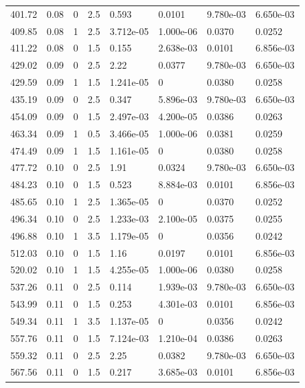 \documentclass[preview]{standalone}
\begin{document}
{{{\begin{tabular}{L{1.2cm}C{1.2cm} C{0.3cm}C{0.5cm} C{1.4cm}C{1.4cm} C{1.4cm}C{1.4cm}}
  401.72  &  0.08  & 0     & 2.5 &  0.593  & 0.0101  & 9.780e-03 &  6.650e-03   \\ 
  409.85  &  0.08  & 1     & 2.5 &  3.712e-05  & 1.000e-06  & 0.0370 &  0.0252   \\ 
  411.22  &  0.08  & 0     & 1.5 &  0.155  & 2.638e-03  & 0.0101 &  6.856e-03   \\ 
  429.02  &  0.09  & 0     & 2.5 &  2.22  & 0.0377  & 9.780e-03 &  6.650e-03   \\ 
  429.59  &  0.09  & 1     & 1.5 &  1.241e-05  & 0  & 0.0380 &  0.0258   \\ 
  435.19  &  0.09  & 0     & 2.5 &  0.347  & 5.896e-03  & 9.780e-03 &  6.650e-03   \\ 
  454.09  &  0.09  & 0     & 1.5 &  2.497e-03  & 4.200e-05  & 0.0386 &  0.0263   \\ 
  463.34  &  0.09  & 1     & 0.5 &  3.466e-05  & 1.000e-06  & 0.0381 &  0.0259   \\ 
  474.49  &  0.09  & 1     & 1.5 &  1.161e-05  & 0  & 0.0380 &  0.0258   \\ 
  477.72  &  0.10  & 0     & 2.5 &  1.91  & 0.0324  & 9.780e-03 &  6.650e-03   \\ 
  484.23  &  0.10  & 0     & 1.5 &  0.523  & 8.884e-03  & 0.0101 &  6.856e-03   \\ 
  485.65  &  0.10  & 1     & 2.5 &  1.365e-05  & 0  & 0.0370 &  0.0252   \\ 
  496.34  &  0.10  & 0     & 2.5 &  1.233e-03  & 2.100e-05  & 0.0375 &  0.0255   \\ 
  496.88  &  0.10  & 1     & 3.5 &  1.179e-05  & 0  & 0.0356 &  0.0242   \\ 
  512.03  &  0.10  & 0     & 1.5 &  1.16  & 0.0197  & 0.0101 &  6.856e-03   \\ 
  520.02  &  0.10  & 1     & 1.5 &  4.255e-05  & 1.000e-06  & 0.0380 &  0.0258   \\ 
  537.26  &  0.11  & 0     & 2.5 &  0.114  & 1.939e-03  & 9.780e-03 &  6.650e-03   \\ 
  543.99  &  0.11  & 0     & 1.5 &  0.253  & 4.301e-03  & 0.0101 &  6.856e-03   \\ 
  549.34  &  0.11  & 1     & 3.5 &  1.137e-05  & 0  & 0.0356 &  0.0242   \\ 
  557.76  &  0.11  & 0     & 1.5 &  7.124e-03  & 1.210e-04  & 0.0386 &  0.0263   \\ 
  559.32  &  0.11  & 0     & 2.5 &  2.25  & 0.0382  & 9.780e-03 &  6.650e-03   \\ 
  567.56  &  0.11  & 0     & 1.5 &  0.217  & 3.685e-03  & 0.0101 &  6.856e-03   \\ 

\end{tabular}}}}
\end{document}
